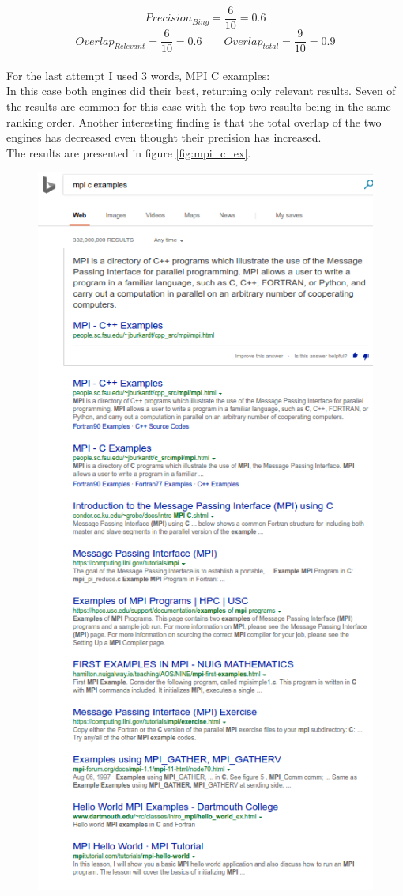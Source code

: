 \documentclass{article}
\begin{document}
$$Precision_{Bing}=\frac{6}{10}=0.6$$
$$Overlap_{Relevant} =\frac{6}{10}=0.6 \qquad Overlap_{total} =\frac{9}{10}=0.9$$
\\For the last attempt I used 3 words, MPI C examples:\\
In this case both engines did their best, returning only relevant results. Seven of the results are common for this case with the top two results being in the same ranking order. Another interesting finding is that the total overlap of the two engines has decreased even thought their precision has increased.\\
The results are presented in figure \ref{fig:mpi_c_ex}.
\begin{figure}
	\includegraphics[scale=0.5]{bing_mpi_c_ex.png}

\end{figure}
\end{document}
